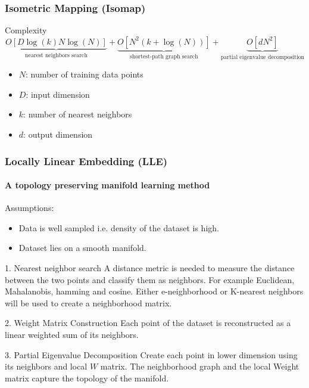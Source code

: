 \documentclass{beamer}
\begin{document}
\begin{frame}
  \frametitle{Isometric Mapping (Isomap)}
  \begin{block}{Complexity}
    \[
      \underbrace{O[D \log(k) N \log(N)]}_{\text{nearest neighbors search}}  + 
      \underbrace{O[N^2(k + \log(N))]}_{\text{shortest-path graph search}} + 
      \underbrace{O[d N^2]}_{\text{partial eigenvalue decomposition}}
    \]
    \begin{itemize}
      \item $N$: number of training data points
      \item $D$: input dimension
      \item $k$: number of nearest neighbors
      \item $d$: output dimension
    \end{itemize}
  \end{block}
  
\end{frame}
% 
% 
% 
% 
% 
% 
\begin{frame}
  \frametitle{Locally Linear Embedding (LLE)}
  \framesubtitle{A topology preserving manifold learning method}

  Assumptions:
  \begin{itemize}
    \item Data is well sampled i.e. density of the dataset is high.
    \item Dataset lies on a smooth manifold.
  \end{itemize}

  \begin{block}{1. Nearest neighbor search}
    A distance metric is needed to measure the distance between the two points and classify them as neighbors. 
    For example Euclidean, Mahalanobis, hamming and cosine. 
    Either e-neighborhood or K-nearest neighbors will be used to create a neighborhood matrix.
  \end{block}

  \begin{block}{2. Weight Matrix Construction}
    Each point of the dataset is reconstructed as a linear weighted sum of its neighbors.
  \end{block}

  \begin{block}{3. Partial Eigenvalue Decomposition}
    Create each point in lower dimension using its neighbors and local $W$ matrix. 
    The neighborhood graph and the local Weight matrix capture the topology of the manifold.
  \end{block}

\end{frame}
\end{document}
